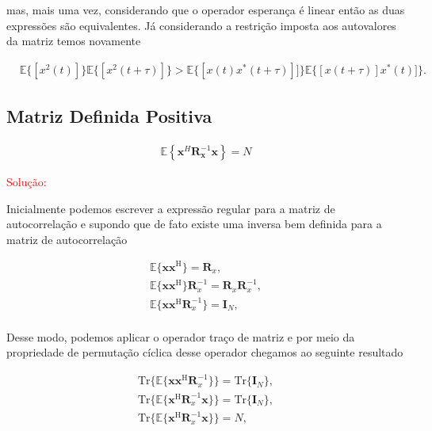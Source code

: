         mas, mais uma vez, considerando que o operador esperança é linear então as duas expressões são equivalentes. Já considerando a
        restrição imposta aos autovalores da matriz temos novamente
        
        \begin{align}
            &\mathbb{E}\{[x^{2}(t)]\} \mathbb{E}\{[x^{2}(t + \tau)]\} > \mathbb{E}\{[x(t)x^{*}(t + \tau)]]\}  \mathbb{E}\{[x(t + \tau)]x^{*}(t)]\}.
        \end{align}
    

\subsection{Matriz Definida Positiva} %

\begin{align}
    \mathbb{E}\left\{\mathbf{x}^H \mathbf{R}_{\mathbf{x}}^{-1} \mathbf{x} \right\} = N
\end{align}

\textcolor{red}{Solução:}

Inicialmente podemos escrever a expressão regular para a matriz de autocorrelação e supondo que de fato existe uma inversa bem definida 
para a matriz de autocorrelação

\begin{align}
    \mathbb{E}\{\mathbf{x} \mathbf{x}^{\text{H}}\} = \mathbf{R}_{x}, \\
    \mathbb{E}\{\mathbf{x} \mathbf{x}^{\text{H}}\}\mathbf{R}^{-1}_{x} = \mathbf{R}_{x}\mathbf{R}^{-1}_{x}, \\
    \mathbb{E}\{\mathbf{x} \mathbf{x}^{\text{H}}\mathbf{R}^{-1}_{x}\} = \mathbf{I}_{N}, \\
\end{align}

Desse modo, podemos aplicar o operador traço de matriz e por meio da propriedade de permutação cíclica desse operador chegamos ao seguinte resultado

\begin{align}
    \text{Tr}\{\mathbb{E}\{\mathbf{x} \mathbf{x}^{\text{H}}\mathbf{R}^{-1}_{x}\}\} = \text{Tr}\{\mathbf{I}_{N}\}, \\
    \text{Tr}\{\mathbb{E}\{\mathbf{x}^{\text{H}}\mathbf{R}^{-1}_{x} \mathbf{x}\}\} = \text{Tr}\{\mathbf{I}_{N}\}, \\
    \text{Tr}\{\mathbb{E}\{\mathbf{x}^{\text{H}}\mathbf{R}^{-1}_{x} \mathbf{x}\}\} = N,
\end{align}

